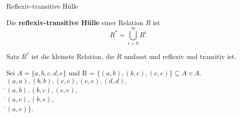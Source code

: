 \begin{frame}{Reflexiv-transitive Hülle}
	\begin{Definition}
		Die \textbf{reflexiv-transitive Hülle} einer Relation $R$ ist
		$$R^\ast = \bigcup \limits_{i=0}^\infty R^i$$
	\end{Definition}

	\pause
	\begin{block}{Satz}
		$R^*$ ist die kleinste Relation, die $R$ umfasst und reflexiv und
		transitiv ist.
	\end{block}

	\pause
	\begin{Beispiel}
		Sei $A = \{a, b, c, d, e\}$ und R = $\{(a, b), (b, c), (c, e)\} \subseteq A \times A$. \\ \pause
		$(a,a), (b,b), (c,c), (e,e), (d,d), $ \\
		\.          {\hphantom{$(a.$}}$(a,b), (b,c), (c,e),$ \\
		\.          {\hphantom{$(a,a),$}}$(a,c), (b,e),$ \\
		\.          {\hphantom{$(a,a),(b.$}}$(a,e)\}.$
	\end{Beispiel}
	
\end{frame}


